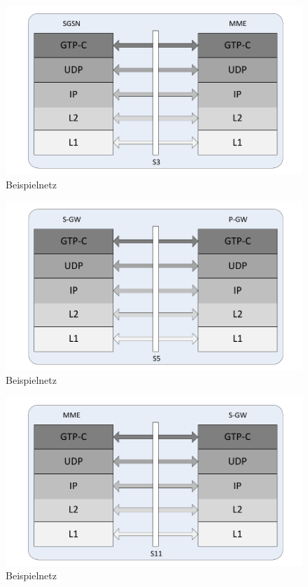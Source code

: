 \begin{figure}[htbp]
 \centering
 \includegraphics[width=1.0\textwidth]{images/3gpp/SGSN-MME-layers.pdf}
 \caption{Beispielnetz}\label{fig:3gpp-sgsnmme}
\end{figure}

\begin{figure}[htbp]
 \centering
 \includegraphics[width=1.0\textwidth]{images/3gpp/S-GW-P-GW-layers.pdf}
 \caption{Beispielnetz}\label{fig:3gpp-sgwpgw}
\end{figure}

\begin{figure}[htbp]
 \centering
 \includegraphics[width=1.0\textwidth]{images/3gpp/MME-S-GW-layers.pdf}
 \caption{Beispielnetz}\label{fig:3gpp-mmesgw}
\end{figure}


